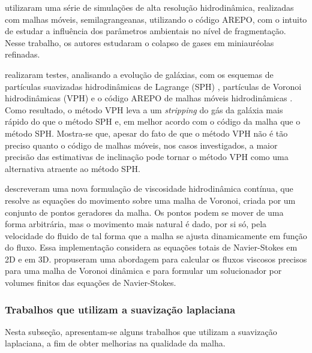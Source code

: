  utilizaram uma série de simulações de alta resolução hidrodinâmica, realizadas com malhas móveis, semilagrangeanas, utilizando o código AREPO, com o intuito de estudar a influência dos parâmetros ambientais no nível de fragmentação. Nesse trabalho, os autores estudaram o colapso de gases em miniauréolas refinadas.

 realizaram testes, analisando a evolução de galáxias, com os esquemas de partículas suavizadas hidrodinâmicas de Lagrange (SPH) \cite{Springel2005}, partículas de Voronoi hidrodinâmicas (VPH) \cite{Hes2010} e o código AREPO de malhas móveis hidrodinâmicas \cite{Springel2009}. Como resultado, o método VPH leva a um {\it stripping} do gás da galáxia mais rápido do que o método SPH e, em melhor acordo com o código da malha que o método SPH. Mostra-se que, apesar do fato de que o método VPH não é tão preciso quanto o código de malhas móveis, nos casos investigados, a maior precisão das estimativas de inclinação pode tornar o método VPH como uma alternativa atraente ao método SPH.

 descreveram uma nova formulação de viscosidade hidrodinâmica contínua, que resolve as equações do movimento sobre uma malha de Voronoi, criada por um conjunto de pontos geradores da malha. Os pontos podem se mover de uma forma arbitrária, mas o movimento mais natural é dado, por si só, pela velocidade do fluido de tal forma que a malha se ajusta dinamicamente em função do fluxo. Essa implementação considera as equações totais de Navier-Stokes em 2D e em 3D.  propuseram uma abordagem para calcular os fluxos viscosos precisos para uma malha de Voronoi dinâmica e para formular um solucionador por volumes finitos das equações de Navier-Stokes.

\subsubsection{Trabalhos que utilizam a suavização laplaciana}
\label{cap_movimento_laplaciano}

Nesta subseção, apresentam-se alguns trabalhos que utilizam a suavização laplaciana, a fim de obter melhorias na qualidade da malha.

